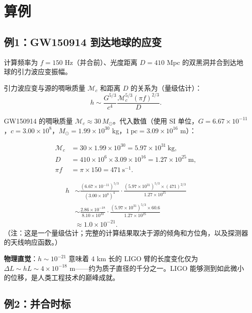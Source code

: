 \section{算例}
\label{sec:calculations}

\subsection{例1：GW150914 到达地球的应变}

计算频率为 $f = 150$ Hz（并合前）、光度距离 $D = 410$ Mpc 的双黑洞并合到达地球的引力波应变振幅。

引力波应变与源的啁啾质量 $\mathcal{M}_c$ 和距离 $D$ 的关系为（量级估计）：
\begin{equation}
    h \sim \frac{G^{5/3}}{c^4} \frac{\mathcal{M}_c^{5/3} (\pi f)^{2/3}}{D}.
\end{equation}

GW150914 的啁啾质量 $\mathcal{M}_c \approx 30\,M_\odot$。代入数值（使用 SI 单位，$G = 6.67\times10^{-11}$，$c = 3.00\times10^8$，$M_\odot = 1.99\times10^{30}$ kg，$1\ \text{pc} = 3.09\times10^{16}$ m）：

\begin{align}
    \mathcal{M}_c &= 30 \times 1.99\times10^{30} = 5.97\times10^{31}\ \text{kg},\\[2pt]
    D &= 410 \times 10^6 \times 3.09\times10^{16} = 1.27\times10^{25}\ \text{m},\\[2pt]
    \pi f &= \pi \times 150 = 471\ \text{s}^{-1}.
\end{align}

\begin{align}
    h &\sim \frac{(6.67\times10^{-11})^{5/3}}{(3.00\times10^8)^4} \cdot \frac{(5.97\times10^{31})^{5/3} \times (471)^{2/3}}{1.27\times10^{25}} \\[2pt]
      &\sim \frac{2.86\times10^{-18}}{8.10\times10^{33}} \cdot \frac{(5.97\times10^{31})^{5/3} \times 60.6}{1.27\times10^{25}} \\[2pt]
      &\approx 1.0 \times 10^{-21}.
\end{align}
（注：这是一个量级估计；完整的计算结果取决于源的倾角和方位角，以及探测器的天线响应函数。）

\textbf{物理直觉}：$h \sim 10^{-21}$ 意味着 4 km 长的 LIGO 臂的长度变化仅为 $\Delta L \sim h L \sim 4 \times 10^{-18}$ m——约为质子直径的千分之一。LIGO 能够测到如此微小的位移，是人类工程技术的巅峰成就。

\subsection{例2：并合时标}

